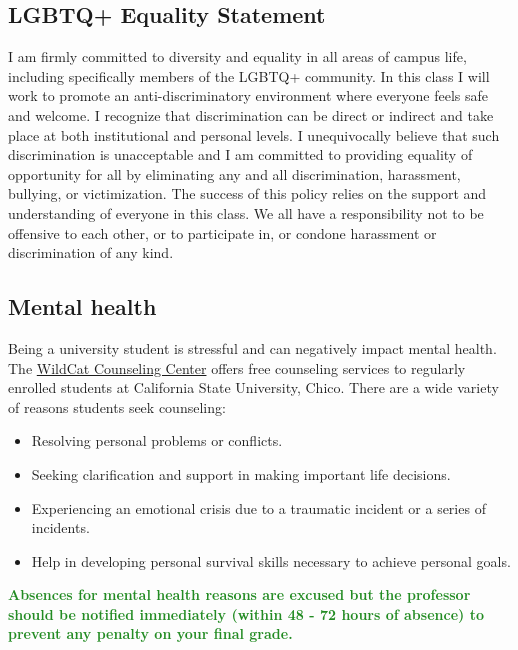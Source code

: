 \documentclass[11pt,]{article}
\providecommand{\tightlist}{%
  \setlength{\itemsep}{0pt}\setlength{\parskip}{0pt}}
\begin{document}
\hypertarget{lgbtq-equality-statement}{%
\subsection{LGBTQ+ Equality Statement}\label{lgbtq-equality-statement}}

I am firmly committed to diversity and equality in all areas of campus
life, including specifically members of the LGBTQ+ community. In this
class I will work to promote an anti-discriminatory environment where
everyone feels safe and welcome. I recognize that discrimination can be
direct or indirect and take place at both institutional and personal
levels. I unequivocally believe that such discrimination is unacceptable
and I am committed to providing equality of opportunity for all by
eliminating any and all discrimination, harassment, bullying, or
victimization. The success of this policy relies on the support and
understanding of everyone in this class. We all have a responsibility
not to be offensive to each other, or to participate in, or condone
harassment or discrimination of any kind.

\hypertarget{mental-health}{%
\subsection{Mental health}\label{mental-health}}

Being a university student is stressful and can negatively impact mental
health. The \href{https://www.csuchico.edu/counseling/}{WildCat
Counseling Center} offers free counseling services to regularly enrolled
students at California State University, Chico. There are a wide variety
of reasons students seek counseling:

\begin{itemize}
\tightlist
\item
  Resolving personal problems or conflicts.
\item
  Seeking clarification and support in making important life decisions.
\item
  Experiencing an emotional crisis due to a traumatic incident or a
  series of incidents.
\item
  Help in developing personal survival skills necessary to achieve
  personal goals.
\end{itemize}

\textcolor{ForestGreen}{\bf{Absences for mental health reasons are excused but the professor should be notified immediately (within 48 - 72 hours of absence) to prevent any penalty on your final grade.}}
\end{document}

